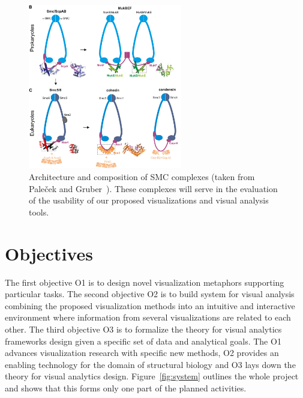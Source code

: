 \documentclass[11pt,a4paper,titlepage,oneside,onecolumn]{article}
\begin{document}
\begin{figure}[h]
  \centering
  \includegraphics[width=0.6\textwidth]{pics/telomer.png}
  \caption{Architecture and composition of SMC complexes (taken from Pale\v{c}ek and Gruber~\cite{Palecek2015}). These complexes will serve in the evaluation of the usability of our proposed visualizations and visual analysis tools.}
  \label{fig:telomere}
\end{figure}

\section{Objectives}
The first objective O1 is to design novel visualization metaphors supporting particular tasks. The second objective O2 is to build system for visual analysis combining the proposed visualization methods into an intuitive and interactive environment where information from several visualizations are related to each other. The third objective O3 is to formalize the theory for visual analytics frameworks design given a specific set of data and analytical goals. 
The O1 advances visualization research with specific new methods, O2 provides an enabling technology for the domain of structural biology and O3 lays down the theory for visual analytics design.
Figure~\ref{fig:system} outlines the whole project and shows that this forms only one part of the planned activities.  


\end{document}
